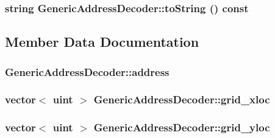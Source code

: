 \hypertarget{classGenericAddressDecoder_5b4395166709804b6dd9cb784bc45a1d}{
\subsubsection[{toString}]{\setlength{\rightskip}{0pt plus 5cm}string GenericAddressDecoder::toString () const}}
\label{classGenericAddressDecoder_5b4395166709804b6dd9cb784bc45a1d}




\subsection{Member Data Documentation}
\hypertarget{classGenericAddressDecoder_e4958f1eabb1f538cbfa4f49a70819ee}{
\subsubsection[{address}]{ {\bf GenericAddressDecoder::address}}}
\label{classGenericAddressDecoder_e4958f1eabb1f538cbfa4f49a70819ee}


\hypertarget{classGenericAddressDecoder_7b34be1b61592aa81a59122776d35d0a}{
\subsubsection[{grid\_\-xloc}]{\setlength{\rightskip}{0pt plus 5cm}vector$<$ {\bf uint} $>$ {\bf GenericAddressDecoder::grid\_\-xloc}}}
\label{classGenericAddressDecoder_7b34be1b61592aa81a59122776d35d0a}


\hypertarget{classGenericAddressDecoder_1ba45f3ca9054494e325c9ab49b61da8}{
\subsubsection[{grid\_\-yloc}]{\setlength{\rightskip}{0pt plus 5cm}vector$<$ {\bf uint} $>$ {\bf GenericAddressDecoder::grid\_\-yloc}}}
\label{classGenericAddressDecoder_1ba45f3ca9054494e325c9ab49b61da8}


